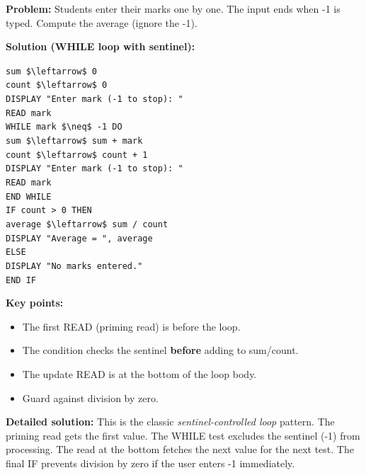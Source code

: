 \documentclass[11pt]{article}
\begin{document}
\begin{exoresolu}
\textbf{Problem:} Students enter their marks one by one. The input ends when -1 is typed. Compute the average (ignore the -1).

\textbf{Solution (WHILE loop with sentinel):}
\begin{flushleft}
\texttt{sum \$\textbackslash{}leftarrow\$ 0}\\
\texttt{count \$\textbackslash{}leftarrow\$ 0}\\
\texttt{DISPLAY "Enter mark (-1 to stop): "}\\
\texttt{READ mark}\\
\texttt{WHILE mark \$\textbackslash{}neq\$ -1 DO}\\
\quad\texttt{sum \$\textbackslash{}leftarrow\$ sum + mark}\\
\quad\texttt{count \$\textbackslash{}leftarrow\$ count + 1}\\
\quad\texttt{DISPLAY "Enter mark (-1 to stop): "}\\
\quad\texttt{READ mark}\\
\texttt{END WHILE}\\
\texttt{IF count > 0 THEN}\\
\quad\texttt{average \$\textbackslash{}leftarrow\$ sum / count}\\
\quad\texttt{DISPLAY "Average = ", average}\\
\texttt{ELSE}\\
\quad\texttt{DISPLAY "No marks entered."}\\
\texttt{END IF}
\end{flushleft}

\textbf{Key points:}
\begin{itemize}
  \item The first READ (priming read) is before the loop.
  \item The condition checks the sentinel \textbf{before} adding to sum/count.
  \item The update READ is at the bottom of the loop body.
  \item Guard against division by zero.
\end{itemize}
\tcblower
\textbf{Detailed solution:} This is the classic \emph{sentinel-controlled loop} pattern. The priming read gets the first value. The WHILE test excludes the sentinel (-1) from processing. The read at the bottom fetches the next value for the next test. The final IF prevents division by zero if the user enters -1 immediately.
\end{exoresolu}
\end{document}
